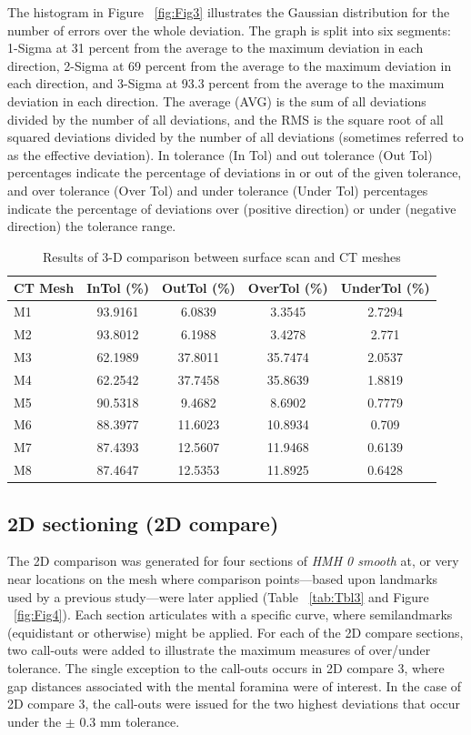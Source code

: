 \documentclass[review]{elsarticle}
\begin{document}
The histogram in Figure ~\ref{fig:Fig3} illustrates the Gaussian distribution for the number of errors over the whole deviation. The graph is split into six segments: 1-Sigma at 31 percent from the average to the maximum deviation in each direction, 2-Sigma at 69 percent from the average to the maximum deviation in each direction, and 3-Sigma at 93.3 percent from the average to the maximum deviation in each direction. The average (AVG) is the sum of all deviations divided by the number of all deviations, and the RMS is the square root of all squared deviations divided by the number of all deviations (sometimes referred to as the effective deviation). In tolerance (In Tol) and out tolerance (Out Tol) percentages indicate the percentage of deviations in or out of the given tolerance, and over tolerance (Over Tol) and under tolerance (Under Tol) percentages indicate the percentage of deviations over (positive direction) or under (negative direction) the tolerance range. 

\begin{table}[tbh]\centering
\footnotesize
\caption{Results of 3-D comparison between surface scan and CT meshes}
\centering
\begin{tabular}{lcccc}
\hline
CT Mesh & InTol (\%) & OutTol (\%) & OverTol (\%) & UnderTol (\%)\\
\hline
M1 & 93.9161 & 6.0839 & 3.3545 & 2.7294\\
M2 & 93.8012 & 6.1988 & 3.4278 & 2.771\\
M3 & 62.1989 & 37.8011 & 35.7474 & 2.0537\\
M4 & 62.2542 & 37.7458 & 35.8639 & 1.8819\\
M5 & 90.5318 & 9.4682 & 8.6902 & 0.7779\\
M6 & 88.3977 & 11.6023 & 10.8934 & 0.709\\
M7 & 87.4393 & 12.5607 & 11.9468 & 0.6139\\
M8 & 87.4647 & 12.5353 & 11.8925 & 0.6428\\
\hline
\end{tabular}
\label{tab:Tbl2}
\end{table}

\subsection{2D sectioning (2D compare)}

The 2D comparison was generated for four sections of \textit{HMH 0 smooth} at, or very near locations on the mesh where comparison points---based upon landmarks used by a previous study---were later applied (Table ~\ref{tab:Tbl3} and Figure ~\ref{fig:Fig4}). Each section articulates with a specific curve, where semilandmarks (equidistant or otherwise) might be applied. For each of the 2D compare sections, two call-outs were added to illustrate the maximum measures of over/under tolerance. The single exception to the call-outs occurs in 2D compare 3, where gap distances associated with the mental foramina were of interest. In the case of 2D compare 3, the call-outs were issued for the two highest deviations that occur under the $\pm$ 0.3 mm tolerance.
\end{document}
